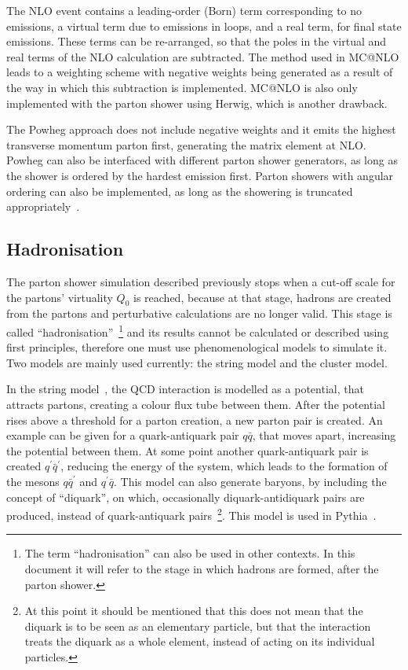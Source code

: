 The NLO event contains a leading-order (Born) term corresponding to no emissions, a virtual term due to
emissions in loops, and a real term, for final state emissions. These terms can be re-arranged, so that the poles in the virtual and real terms of the NLO calculation
are subtracted. The method used in MC@NLO leads to a weighting scheme with negative weights being generated as a result of the way in which this subtraction is implemented.
MC@NLO is also only implemented with the parton shower using Herwig, which is another drawback.

The Powheg approach does not include negative weights and it emits the highest transverse momentum parton first, generating the matrix element at NLO. Powheg can
also be interfaced with different parton shower generators, as long as the shower is ordered by the hardest emission first. Parton showers with angular ordering
can also be implemented, as long as the showering is truncated appropriately~\cite{top_lhc_gen}.

\subsection{Hadronisation}
\label{subsec:hadronisation}

The parton shower simulation described previously stops when a cut-off scale for the partons' virtuality $Q_0$ is reached,
because at that stage, hadrons are created from the partons and perturbative calculations are no longer valid.
This stage is called
``hadronisation''~\footnote{The term ``hadronisation'' can also be used in other contexts. In this document it will refer to the stage in which
hadrons are formed, after the parton shower.} and its results cannot be calculated or described using first principles, therefore one must use phenomenological
models to simulate it.
Two models are mainly used currently: the string model and the cluster model.

In the string model~\cite{string},
the QCD interaction is modelled as a potential, that attracts partons, creating a colour flux tube between them. After the potential
rises above a threshold for a parton creation, a new parton pair is created. An example can be given for a quark-antiquark pair $q\bar{q}$, that moves apart, increasing
the potential between them. At some point another quark-antiquark pair is created $q^{\prime}\bar{q}^{\prime}$, reducing the energy of the system,
which leads to the formation of the mesons $q\bar{q}^{\prime}$
and $q^{\prime}\bar{q}$. This model can also generate baryons, by including the concept of ``diquark'', on which, occasionally diquark-antidiquark pairs are produced, instead
of quark-antiquark pairs~\footnote{At this point it should be mentioned that this does not mean that the diquark is to be seen as an elementary particle, but that the
interaction treats the diquark as a whole element, instead of acting on its individual particles.}. This model is used in Pythia~\cite{pythia}.

